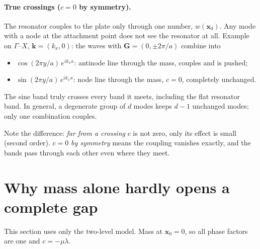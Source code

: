 \paragraph{True crossings ($c = 0$ by symmetry).}
The resonator couples to the plate only through one number, $w(\mathbf{x}_0)$.
Any mode with a node at the attachment point does not see the resonator at
all. Example on $\Gamma$--$X$, $\mathbf{k} = (k_x, 0)$: the waves with
$\mathbf{G} = (0, \pm 2\pi/a)$ combine into
\begin{itemize}
  \item $\cos(2\pi y/a)\, e^{i k_x x}$: antinode line through the mass, couples
        and is pushed;
  \item $\sin(2\pi y/a)\, e^{i k_x x}$: node line through the mass, $c = 0$,
        completely unchanged.
\end{itemize}
The sine band truly crosses every band it meets, including the flat resonator
band. In general, a degenerate group of $d$ modes keeps $d - 1$ unchanged
modes; only one combination couples.

Note the difference: \emph{far from a crossing} $c$ is not zero, only its
effect is small (second order). $c = 0$ \emph{by symmetry} means the coupling
vanishes exactly, and the bands pass through each other even where they meet.

\section{Why mass alone hardly opens a complete gap}
\label{sec:mass_only_gap}

This section uses only the two-level model. Mass at $\mathbf{x}_0 = 0$, so all
phase factors are one and $c = -\mu\lambda$.

